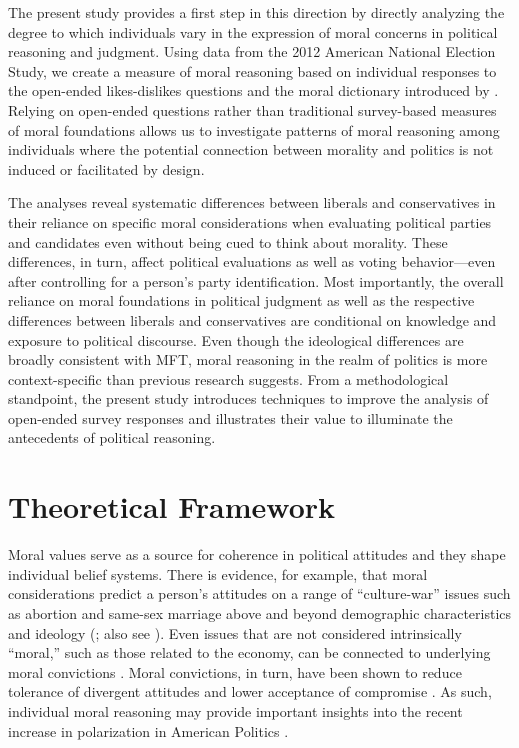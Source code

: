 \documentclass[12pt]{article}
\begin{document}
The present study provides a first step in this direction by directly analyzing the degree to which individuals vary in the expression of moral concerns in political reasoning and judgment. Using data from the 2012 American National Election Study, we create a measure of moral reasoning based on individual responses to the open-ended likes-dislikes questions and the moral dictionary introduced by \citet{graham2009liberals}. Relying on open-ended questions rather than traditional survey-based measures of moral foundations allows us to investigate patterns of moral reasoning among individuals where the potential connection between morality and politics is not induced or facilitated by design.

The analyses reveal systematic differences between liberals and conservatives in their reliance on specific moral considerations when evaluating political parties and candidates even without being cued to think about morality.
These differences, in turn, affect political evaluations as well as voting behavior---even after controlling for a person's party identification. Most importantly, the overall reliance on moral foundations in political judgment as well as the respective differences between liberals and conservatives are conditional on knowledge and exposure to political discourse. Even though the ideological differences are broadly consistent with MFT, moral reasoning in the realm of politics is more context-specific than previous research suggests. From a methodological standpoint, the present study introduces techniques to improve the analysis of open-ended survey responses and illustrates their value to illuminate the antecedents of political reasoning.


\section{Theoretical Framework}

Moral values serve as a source for coherence in political attitudes and they shape individual belief systems. There is evidence, for example, that moral considerations predict a person's attitudes on a range of ``culture-war'' issues such as abortion and same-sex marriage above and beyond demographic characteristics and ideology (\citealt{koleva2012tracing}; also see \citealt{clifford2015concerns}). Even issues that are not considered intrinsically ``moral,'' such as those related to the economy, can be connected to underlying moral convictions \citep{ryan2014reconsidering}. Moral convictions, in turn, have been shown to reduce tolerance of divergent attitudes and lower acceptance of compromise \citep[][]{skitka2010psychology,ryan2016no}. As such, individual moral reasoning may provide important insights into the recent increase in polarization in American Politics \citep{iyengar2015fear}.
\end{document}
